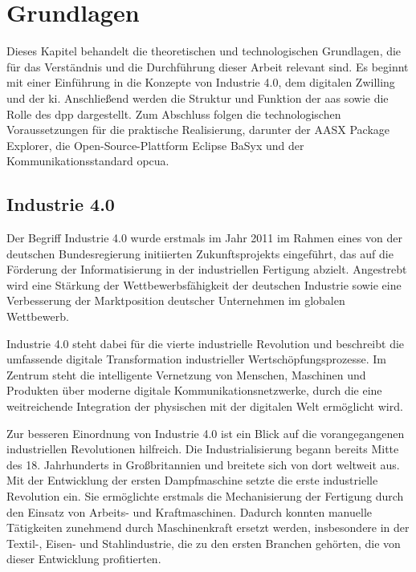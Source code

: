 \newpage
\section{Grundlagen}
\label{sec:Grundlagen}
Dieses Kapitel behandelt die theoretischen und technologischen Grundlagen, die für das Verständnis und die Durchführung dieser Arbeit relevant sind.
Es beginnt mit einer Einführung in die Konzepte von Industrie 4.0, dem digitalen Zwilling und der \acs{ki}.
Anschließend werden die Struktur und Funktion der \acs{aas} sowie die Rolle des \acs{dpp} dargestellt.
Zum Abschluss folgen die technologischen Voraussetzungen für die praktische Realisierung, darunter der AASX Package Explorer, die Open-Source-Plattform Eclipse BaSyx und der Kommunikationsstandard \acs{opcua}.

\subsection{Industrie 4.0}

Der Begriff Industrie 4.0 wurde erstmals im Jahr 2011 im Rahmen eines von der deutschen Bundesregierung initiierten Zukunftsprojekts eingeführt, das auf die Förderung der Informatisierung in der industriellen Fertigung abzielt.
Angestrebt wird eine Stärkung der Wettbewerbsfähigkeit der deutschen Industrie sowie eine Verbesserung der Marktposition deutscher Unternehmen im globalen Wettbewerb.

Industrie 4.0 steht dabei für die vierte industrielle Revolution und beschreibt die umfassende digitale Transformation industrieller Wertschöpfungsprozesse. 
Im Zentrum steht die intelligente Vernetzung von Menschen, Maschinen und Produkten über moderne digitale Kommunikationsnetzwerke, durch die eine weitreichende Integration der physischen mit der digitalen Welt ermöglicht wird.

Zur besseren Einordnung von Industrie 4.0 ist ein Blick auf die vorangegangenen industriellen Revolutionen hilfreich.
Die Industrialisierung begann bereits Mitte des 18. Jahrhunderts in Großbritannien und breitete sich von dort weltweit aus. 
Mit der Entwicklung der ersten Dampfmaschine setzte die erste industrielle Revolution ein. 
Sie ermöglichte erstmals die Mechanisierung der Fertigung durch den Einsatz von Arbeits- und Kraftmaschinen. 
Dadurch konnten manuelle Tätigkeiten zunehmend durch Maschinenkraft ersetzt werden, insbesondere in der Textil-, Eisen- und Stahlindustrie, die zu den ersten Branchen gehörten, die von dieser Entwicklung profitierten.

